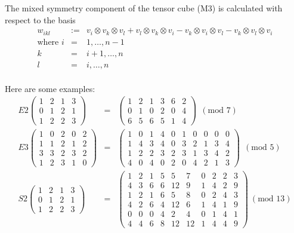 The mixed symmetry component of the tensor cube (M3) is calculated
with respect to the basis
\begin{eqnarray*}
	w_{ikl} & := & v_i\otimes v_k\otimes v_l
		+ v_l\otimes v_k\otimes v_i
		- v_k\otimes v_i\otimes v_l
		- v_k\otimes v_l\otimes v_i \\
	\mbox{where }i & = & 1,\ldots,n-1\\
	k & = & i+1,\ldots,n\\
	l & = & i,\ldots,n\\
\end{eqnarray*}

Here are some examples:
\begin{eqnarray*}
E2\left(\begin{array}{cccc}
    1&2&1&3\\
    0&1&2&1\\
    1&2&2&3
\end{array}\right)
& = &
\left(\begin{array}{cccccc}
    1&2&1&3&6&2\\
    0&1&0&2&0&4\\
    6&5&6&5&1&4
\end{array}\right)
\ \ (\mbox{mod }7)\\
%
E3\left(\begin{array}{ccccc}
     1&0&2&0&2\\
     1&1&2&1&2\\
     3&3&2&3&2\\
     1&2&3&1&0
\end{array}\right)
& = &
\left(\begin{array}{cccccccccc}
     1&0&1&4&0&1&0&0&0&0\\
     1&4&3&4&0&3&2&1&3&4\\
     1&2&2&3&2&3&1&3&4&2\\
     4&0&4&0&2&0&4&2&1&3
\end{array}\right)
\ \ (\mbox{mod }5)\\
%
S2\left(\begin{array}{cccc}
    1&2&1&3 \\
    0&1&2&1 \\
    1&2&2&3
\end{array}\right)
& = &
\left(\begin{array}{cccccccccc}
  1 & 2 & 1 & 5 & 5 & 7 & 0 & 2 & 2 & 3 \\
  4 & 3 & 6 & 6 &12 & 9 & 1 & 4 & 2 & 9 \\
  1 & 2 & 1 & 6 & 5 & 8 & 0 & 2 & 4 & 3 \\
  4 & 2 & 6 & 4 &12 & 6 & 1 & 4 & 1 & 9 \\
  0 & 0 & 0 & 4 & 2 & 4 & 0 & 1 & 4 & 1 \\
  4 & 4 & 6 & 8 &12 &12 & 1 & 4 & 4 & 9
\end{array}\right)
\ (\mbox{mod }13)
\end{eqnarray*}



